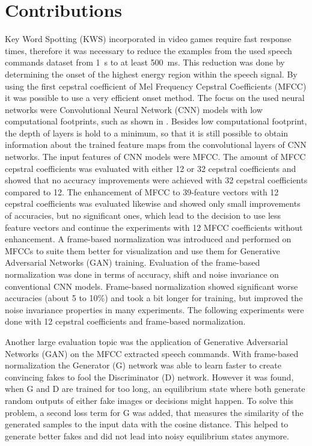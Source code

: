 
\section{Contributions}
\thesisStateNew
Key Word Spotting (KWS) incorporated in video games require fast response times, therefore it was necessary to reduce the examples from the used speech commands dataset \cite{Warden2018} from \SI{1}{\second} to at least \SI{500}{\milli\second}.
This reduction was done by determining the onset of the highest energy region within the speech signal.
By using the first cepstral coefficient of Mel Frequency Cepstral Coefficients (MFCC) it was possible to use a very efficient onset method.
The focus on the used neural networks were Convolutional Neural Network (CNN) models with low computational footprints, such as shown in \cite{Sainath2015}.
Besides low computational footprint, the depth of layers is hold to a minimum, so that it is still possible to obtain information about the trained feature maps from the convolutional layers of CNN networks.
The input features of CNN models were MFCC.
The amount of MFCC cepstral coefficients was evaluated with either 12 or 32 cepstral coefficients and showed that no accuracy improvements were achieved with 32 cepstral coefficients compared to 12.
The enhancement of MFCC to 39-feature vectors with 12 cepstral coefficients was evaluated likewise and showed only small improvements of accuracies, but no significant ones, which lead to the decision to use less feature vectors and continue the experiments with 12 MFCC coefficients without enhancement.
A frame-based normalization was introduced and performed on MFCCs to suite them better for visualization and use them for Generative Adversarial Networks (GAN) training.
Evaluation of the frame-based normalization was done in terms of accuracy, shift and noise invariance on conventional CNN models.
Frame-based normalization showed significant worse accuracies (about 5 to 10\%) and took a bit longer for training, but improved the noise invariance properties in many experiments.
The following experiments were done with 12 cepstral coefficients and frame-based normalization.

Another large evaluation topic was the application of Generative Adversarial Networks (GAN) on the MFCC extracted speech commands. 
With frame-based normalization the Generator (G) network was able to learn faster to create convincing fakes to fool the Discriminator (D) network.
However it was found, when G and D are trained for too long, an equilibrium state where both generate random outputs of either fake images or decisions might happen.
To solve this problem, a second loss term for G was added, that measures the similarity of the generated samples to the input data with the cosine distance.
This helped to generate better fakes and did not lead into noisy equilibrium states anymore.

